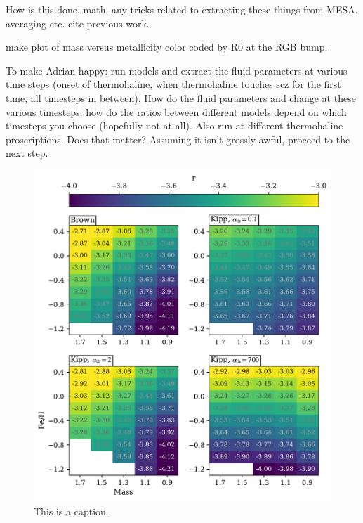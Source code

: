 How is this done. math. any tricks related to extracting these things from MESA. averaging etc. cite previous work.

make plot of mass versus metallicity color coded by R0 at the RGB bump.


To make Adrian happy: run models and extract the fluid parameters at various time steps (onset of thermohaline, when thermohaline touches scz for the first time, all timesteps in between). How do the fluid parameters and change at these various timesteps. how do the ratios between different models depend on which timesteps you choose (hopefully not at all). Also run at different thermohaline proscriptions. Does that matter? Assuming it isn't grossly awful, proceed to the next step.



\begin{figure}
    \centering
    \includegraphics[width=\textwidth]{figures/mesa_spread/mesa_r_spread.pdf}
    \caption{This is a caption. }
    \label{fig:mesa_r_spread}
\end{figure}
